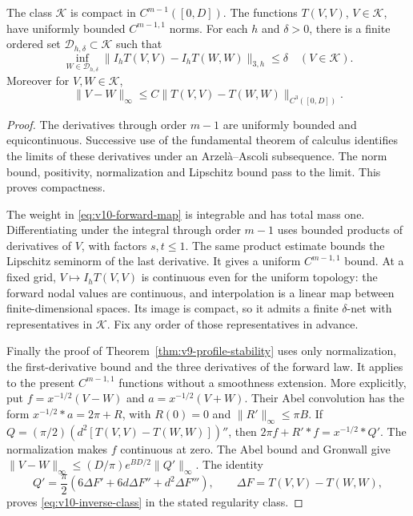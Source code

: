 \begin{lemma}\label{lem:v10-dictionary}
The class $\mathcal K$ is compact in $C^{m-1}([0,D])$. The functions
$T(V,V)$, $V\in\mathcal K$, have uniformly bounded
$C^{m-1,1}$ norms. For each $h$ and $\delta>0$, there is a finite
ordered set $\mathcal D_{h,\delta}\subset\mathcal K$ such that
\begin{equation}\label{eq:v10-net}
 \inf_{W\in\mathcal D_{h,\delta}}
    \|I_hT(V,V)-I_hT(W,W)\|_{3,h}\le\delta
                    \quad(V\in\mathcal K).
\end{equation}
Moreover for $V,W\in\mathcal K$,
\begin{equation}\label{eq:v10-inverse-class}
 \|V-W\|_\infty\le C\|T(V,V)-T(W,W)\|_{C^3([0,D])}.
\end{equation}
\end{lemma}
\begin{proof}
The derivatives through order $m-1$ are uniformly bounded and
equicontinuous. Successive use of the fundamental theorem of calculus
identifies the limits of these derivatives under an Arzel\`a--Ascoli
subsequence. The norm bound, positivity, normalization and Lipschitz
bound pass to the limit. This proves compactness.

The weight in \eqref{eq:v10-forward-map} is integrable and has total
mass one. Differentiating under the integral through order $m-1$
uses bounded products of derivatives of $V$, with factors $s,t\le1$.
The same product estimate bounds the Lipschitz seminorm of the last
derivative. It gives a uniform $C^{m-1,1}$ bound. At a fixed grid,
$V\mapsto I_hT(V,V)$ is continuous even for the uniform topology:
the forward nodal values are continuous, and interpolation is a
linear map between finite-dimensional spaces. Its image is compact,
so it admits a finite $\delta$-net with representatives in
$\mathcal K$. Fix any order of those representatives in advance.

Finally the proof of Theorem~\ref{thm:v9-profile-stability} uses only
normalization, the first-derivative bound and the three derivatives
of the forward law. It applies to the present $C^{m-1,1}$ functions
without a smoothness extension. More explicitly, put
$f=x^{-1/2}(V-W)$ and $a=x^{-1/2}(V+W)$. Their Abel convolution
has the form $x^{-1/2}*a=2\pi+R$, with $R(0)=0$ and
$\|R'\|_\infty\le\pi B$. If
$Q=(\pi/2)(d^2[T(V,V)-T(W,W)])''$, then
$2\pi f+R'*f=x^{-1/2}*Q'$. The normalization makes $f$ continuous
at zero. The Abel bound and Gronwall give
$\|V-W\|_\infty\le(D/\pi)e^{BD/2}\|Q'\|_\infty$.
The identity
\[
 Q'=\frac\pi2\left(6\Delta F'+6d\Delta F''+d^2\Delta F'''\right),
 \qquad \Delta F=T(V,V)-T(W,W),
\]
proves \eqref{eq:v10-inverse-class} in the stated regularity class.
\end{proof}

